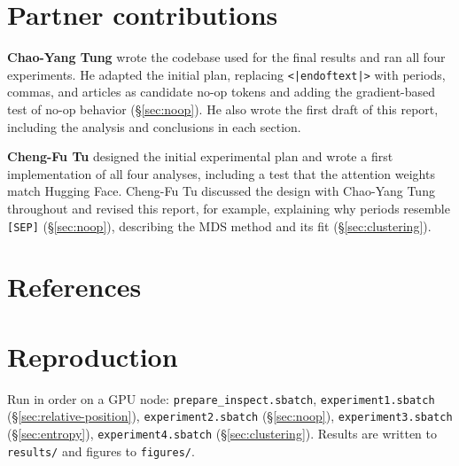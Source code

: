\documentclass{article}
\newcommand{\SEP}{\texttt{[SEP]}}
\newcommand{\eot}{\texttt{<|endoftext|>}}
\begin{document}
\section*{Partner contributions}

\textbf{Chao-Yang Tung} wrote the codebase used for the final results and ran all four experiments. He adapted the initial plan, replacing \eot{} with periods, commas, and articles as candidate no-op tokens and adding the gradient-based test of no-op behavior (\S\ref{sec:noop}). He also wrote the first draft of this report, including the analysis and conclusions in each section.

\textbf{Cheng-Fu Tu} designed the initial experimental plan and wrote a first implementation of all four analyses, including a test that the attention weights match Hugging Face. Cheng-Fu Tu discussed the design with Chao-Yang Tung throughout and revised this report, for example, explaining why periods resemble \SEP{} (\S\ref{sec:noop}), describing the MDS method and its fit (\S\ref{sec:clustering}).

\section*{References}

\medskip

{%
\small
\renewcommand{\bibsection}{}%

}



\clearpage
\appendix
\thispagestyle{ceruleanreport}

\section{Reproduction}
\label{sec:reproduction}

Run in order on a GPU node: \texttt{prepare\_inspect.sbatch}, \texttt{experiment1.sbatch} (\S\ref{sec:relative-position}), \texttt{experiment2.sbatch} (\S\ref{sec:noop}), \texttt{experiment3.sbatch} (\S\ref{sec:entropy}), \texttt{experiment4.sbatch} (\S\ref{sec:clustering}). Results are written to \texttt{results/} and figures to \texttt{figures/}.
\end{document}
